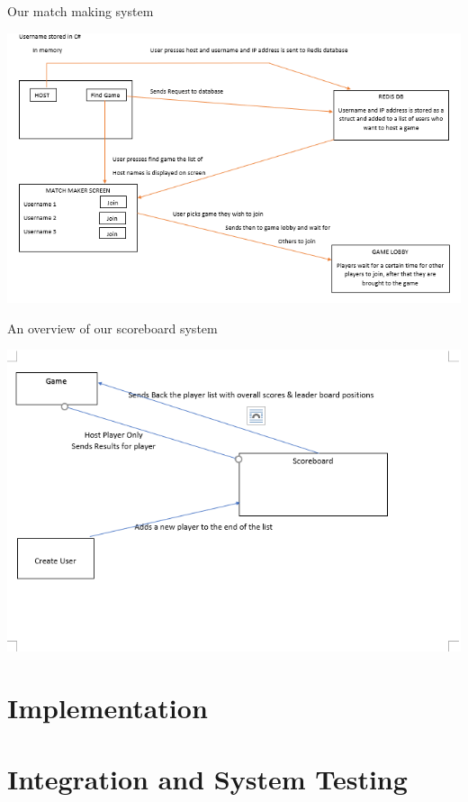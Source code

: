 Our match making system

\includegraphics[width=1\columnwidth]{img/redisMatch.PNG}

An overview of our scoreboard system

\includegraphics[width=1\columnwidth]{img/MariaDBPic.PNG}

\section{Implementation}

\section{Integration and System Testing}